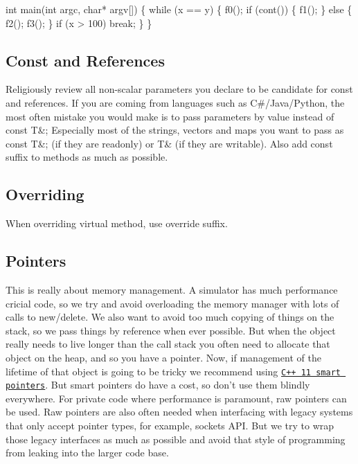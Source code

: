 \begin{DoxyCode}
int main(int argc, char* argv[])
\{
     while (x == y) \{
        f0();
        if (cont()) \{
            f1();
        \} else \{
            f2();
            f3();
        \}
        if (x > 100)
            break;
    \}
\}
\end{DoxyCode}
\hypertarget{md_coding_docs_coding_guidelines_autotoc_md10}{}\subsection{Const and References}\label{md_coding_docs_coding_guidelines_autotoc_md10}
Religiously review all non-\/scalar parameters you declare to be candidate for const and references. If you are coming from languages such as C\#/\+Java/\+Python, the most often mistake you would make is to pass parameters by value instead of {\ttfamily const T\&;} Especially most of the strings, vectors and maps you want to pass as {\ttfamily const T\&;} (if they are readonly) or {\ttfamily T\&} (if they are writable). Also add {\ttfamily const} suffix to methods as much as possible.\hypertarget{md_coding_docs_coding_guidelines_autotoc_md11}{}\subsection{Overriding}\label{md_coding_docs_coding_guidelines_autotoc_md11}
When overriding virtual method, use override suffix.\hypertarget{md_coding_docs_coding_guidelines_autotoc_md12}{}\subsection{Pointers}\label{md_coding_docs_coding_guidelines_autotoc_md12}
This is really about memory management. A simulator has much performance cricial code, so we try and avoid overloading the memory manager with lots of calls to new/delete. We also want to avoid too much copying of things on the stack, so we pass things by reference when ever possible. But when the object really needs to live longer than the call stack you often need to allocate that object on the heap, and so you have a pointer. Now, if management of the lifetime of that object is going to be tricky we recommend using \href{https://cppstyle.wordpress.com/c11-smart-pointers/}{\tt C++ 11 smart pointers}. But smart pointers do have a cost, so don’t use them blindly everywhere. For private code where performance is paramount, raw pointers can be used. Raw pointers are also often needed when interfacing with legacy systems that only accept pointer types, for example, sockets A\+PI. But we try to wrap those legacy interfaces as much as possible and avoid that style of programming from leaking into the larger code base.

